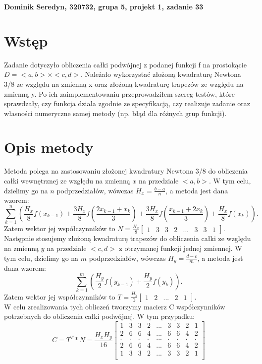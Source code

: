 \documentclass[12pt]{article}
\begin{document}
\textbf{Dominik Seredyn, 320732, grupa 5, projekt 1, zadanie 33}
\section{Wstęp}
Zadanie dotyczyło obliczenia całki podwójnej z podanej funkcji f na prostokącie
$D=<a,b>\times<c,d>$. Należało wykorzystać złożoną kwadraturę Newtona 3/8 ze względu na zmienną x oraz złożoną kwadraturę trapezów ze względu na zmienną y. Po ich zaimplementowaniu przeprowadziłem szereg testów, które sprawdzały, czy funkcja działa zgodnie ze specyfikacją, czy realizuje zadanie oraz własności numeryczne samej metody (np. błąd dla różnych grup funkcji).
\section{Opis metody}
Metoda polega na zastosowaniu złożonej kwadratury Newtona 3/8 do obliczenia całki wewnętrznej ze względu na zmienną $x$ na przedziale $<a,b>$. W tym celu, dzielimy go na $n$ podprzedziałów, wówczas $H_{x}=\frac{b-a}{n}$, a metoda jest dana wzorem:
\[
\sum_{k=1}^{n} (\frac{H_{x}}{8}f(x_{k-1})+\frac{3H_{x}}{8}f(\frac{2x_{k-1}+x_{k}}{3})+\frac{3H_{x}}{8}f(\frac{x_{k-1}+2x_{k}}{3})+\frac{H_{x}}{8}f(x_{k})).
\]
Zatem wektor jej współczynników to $N=\frac{H_{x}}{8}\begin{bmatrix}1 & 3 & 3 & 2 &  ... & 3 & 3 & 1\end{bmatrix}$. \\
Następnie stosujemy złożoną kwadraturę trapezów do obliczenia całki ze względu na zmienną $y$ na przedziale $<c,d>$  z otrzymanej funkcji jednej zmiennej. W tym celu, dzielimy go na $m$ podprzedziałów, wówczas $H_{y}=\frac{d-c}{m}$, a metoda jest dana wzorem:
\[
\sum_{k=1}^{m} (\frac{H_{y}}{2}f(y_{k-1})+\frac{H_{y}}{2}f(y_{k})).
\]
Zatem wektor jej współczynników to $T=\frac{H_{y}}{2}\begin{bmatrix}1 & 2 & ... & 2 & 1\end{bmatrix}$. \\
W celu zrealizowania tych obliczeń tworzymy macierz C współczynników potrzebnych do obliczenia całki podwójnej. W tym przypadku:
\[
C=
T^T*N=
\frac{H_{x}H_{y}}{16}
\begin{bmatrix}
1 & 3 & 3 & 2 &  ... & 3 & 3 & 2 & 1 \\
2 & 6 & 6 & 4 &  ... & 6 & 6 & 4 & 2 \\
. & . & . & . &  ... & . & . & . & . \\
2 & 6 & 6 & 4 &  ... & 6 & 6 & 4 & 2 \\
1 & 3 & 3 & 2 &  ... & 3 & 3 & 2 & 1 \\
\end{bmatrix}
\]
\end{document}
